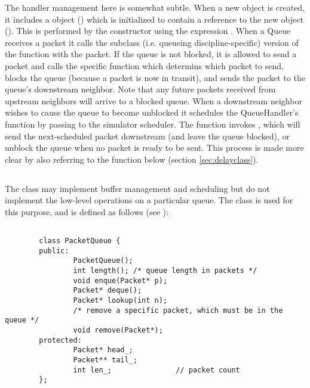 The handler management here is somewhat subtle.
When a new  object is created,
it includes a  object ()
which is initialized to contain a reference to the new  object
().
This is performed by the  constructor using the expression
.
When a Queue receives a packet it calls the subclass
(i.e. queueing discipline-specific) version of
the  function with the packet.
If the queue is not blocked, it is allowed to send a packet and
calls the specific  function which determins which
packet to send, blocks the queue (because a packet is now in transit), and
sends the packet to the queue's downstream neighbor.
Note that any future packets received from upstream neighbors
will arrive to a blocked queue.
When a downstream neighbor wishes to cause the queue to become unblocked
it schedules the QueueHandler's  function by
passing  to the simulator scheduler.
The  function invokes , which
will send the next-scheduled packet downstream (and leave the queue blocked),
or unblock the queue when no packet is ready to be sent.
This process is made more clear by also referring to the
 function below (section \ref{sec:delayclass}).

\subsection{}

The  class may implement buffer management and scheduling but
do not implement the low-level operations on a particular queue.
The  class is used for this purpose, and is defined as follows
(see ):
\begin{small}
\begin{verbatim}

        class PacketQueue {
        public:
                PacketQueue();
                int length(); /* queue length in packets */
                void enque(Packet* p);
                Packet* deque();
                Packet* lookup(int n);
                /* remove a specific packet, which must be in the queue */
                void remove(Packet*);
        protected:
                Packet* head_;
                Packet** tail_;
                int len_;               // packet count
        };
\end{verbatim}
\end{small}

